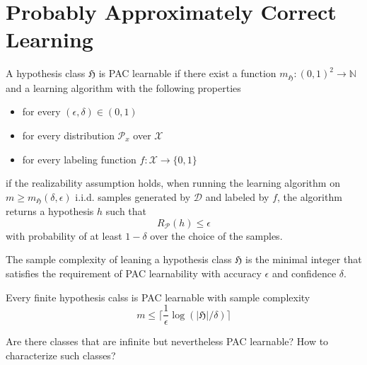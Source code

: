 \section{Probably Approximately Correct Learning}
    \begin{definition}
		A hypothesis class $\mathfrak{H}$ is PAC learnable if there exist a
		function $m_\mathfrak{H}: (0,1)^2 \to \mathbb{N}$ and a learning
		algorithm with the following properties
		\begin{itemize}
			\item for every $(\epsilon, \delta) \in (0,1)$
			\item for every distribution $\mathcal{P}_x$ over $\mathcal{X}$
			\item for every labeling function $f: \mathcal{X} \to \{0,1\}$
		\end{itemize}
		if the realizability assumption holds, when running the learning
		algorithm on $m \geq m_\mathfrak{H}(\delta, \epsilon)$ i.i.d. samples
		generated by $\mathcal{D}$ and labeled by $f$, the algorithm returns a
		hypothesis $h$ such that 
		$$
		R_\mathcal{P}(h) \leq \epsilon
		$$ 
		with probability of at least $1-\delta$ over the choice of the samples.
	\end{definition}

    \begin{definition}
		The sample complexity of leaning a hypothesis class $\mathfrak{H}$ is
		the minimal integer that satisfies the requirement of PAC learnability
		with accuracy $\epsilon$ and confidence $\delta$.
	\end{definition}
	\begin{coro}
		Every finite hypothesis calss is PAC learnable with sample complexity 
		$$
		m \leq \lceil \frac{1}{\epsilon} \log(|\mathfrak{H}|/\delta) \rceil
		$$
	\end{coro}
Are there classes that are infinite but nevertheless PAC learnable? How to
characterize such classes?

